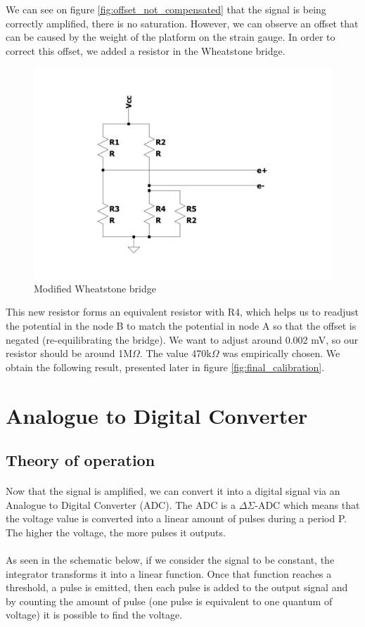 \documentclass{article}[12pt]
\begin{document}
We can see on figure \ref{fig:offset_not_compensated} that the signal is being correctly amplified, there is no saturation. However, we can observe an offset that can be caused by the weight of the platform on the strain gauge.
In order to correct this offset, we added a resistor in the Wheatstone bridge.
\begin{figure}[H]
    \centering
    \includegraphics[width=.6\textwidth]{figures/Mod_Wheatstone.pdf}
    \caption{Modified Wheatstone bridge}
    \label{fig:Mod_Weatstone}
\end{figure}
This new resistor forms an equivalent resistor with R4, which helps us to readjust the potential in the node B to match the potential in node A so that the offset is negated (re-equilibrating the bridge).
We want to adjust around 0.002 mV, so our resistor should be around 1M$\Omega$.
The value 470k$\Omega$ was empirically chosen.
We obtain the following result, presented later in figure \ref{fig:final_calibration}.

\section{Analogue to Digital Converter}
\subsection{Theory of operation}
\paragraph{}
Now that the signal is amplified, we can convert it into a digital signal via an Analogue to Digital Converter (ADC).
The ADC is a $\Delta$$\Sigma$-ADC which means that the voltage value is converted into a linear amount of pulses during a period P. 
The higher the voltage, the more pulses it outputs.\cite{Wikipedia-2022}
\paragraph{}
As seen in the schematic below, if we consider the signal to be constant, the integrator transforms it into a linear function.
Once that function reaches a threshold, a pulse is emitted, then each pulse is added to the output signal and by counting the amount of pulse (one pulse is equivalent to one quantum of voltage) it is possible to find the voltage.\\
\end{document}
